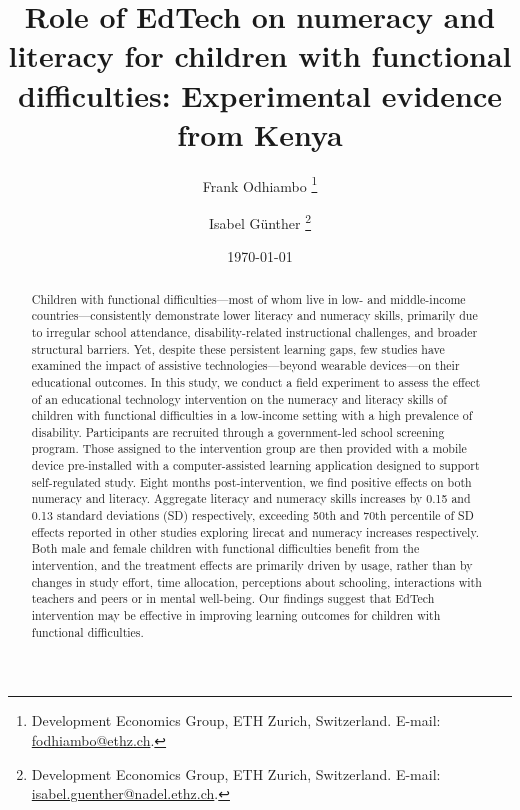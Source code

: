 \documentclass[hidelinks,12pt]{article}
\begin{document}
\begin{singlespace}

\begin{titlepage}
\title{Role of EdTech on numeracy and literacy for children with functional difficulties: Experimental evidence from Kenya}

\author{Frank Odhiambo \thanks{Development Economics Group, ETH Zurich, Switzerland. E-mail: \href{mailto:frankotieno.odhiambo@nadel.ethz.ch}{fodhiambo@ethz.ch}.} \and Isabel G\"unther \thanks{Development Economics Group, ETH Zurich, Switzerland. E-mail: \href{mailto:isabel.guenther@nadel.ethz.ch}{isabel.guenther@nadel.ethz.ch}.}}

\date{\today}
\maketitle
\begin{abstract}
\begin{singlespace}
Children with functional difficulties—most of whom live in low- and middle-income countries—consistently demonstrate lower literacy and numeracy skills, primarily due to irregular school attendance, disability-related instructional challenges, and broader structural barriers. Yet, despite these persistent learning gaps, few studies have examined the impact of assistive technologies—beyond wearable devices—on their educational outcomes. In this study, we conduct a field experiment to assess the effect of an educational technology intervention on the numeracy and literacy skills of children with functional difficulties in a low-income setting with a high prevalence of disability. Participants are recruited through a government-led school screening program. Those assigned to the intervention group are then provided with a mobile device pre-installed with a computer-assisted learning application designed to support self-regulated study. Eight months post-intervention, we find positive effects on both numeracy and literacy. Aggregate literacy and numeracy skills increases by 0.15 and 0.13 standard deviations (SD) respectively, exceeding 50th and 70th percentile of SD effects reported in other studies exploring lirecat and numeracy increases respectively. Both male and female children with functional difficulties benefit from the intervention, and the treatment effects are primarily driven by usage, rather than by changes in study effort, time allocation, perceptions about schooling, interactions with teachers and peers or in mental well-being. Our findings suggest that EdTech intervention may be effective in improving learning outcomes for children with functional difficulties. \\
\end{singlespace}


\end{abstract}
\end{titlepage}
\end{singlespace}
\end{document}
